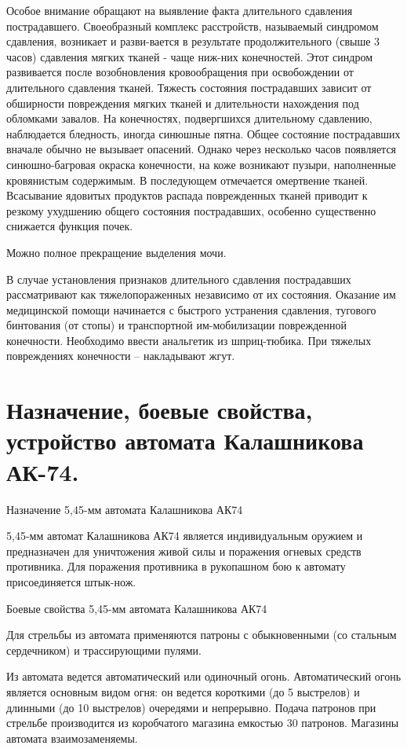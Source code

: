 \documentclass[12pt,a4paper]{report}
\begin{document}
Особое внимание обращают на выявление факта длительного сдавления пострадавшего. Своеобразный комплекс расстройств, называемый синдромом сдавления, возникает и разви-вается в результате продолжительного (свыше 3 часов) сдавления мягких тканей - чаще ниж-них конечностей. Этот синдром развивается после возобновления кровообращения при освобождении от длительного сдавления тканей. Тяжесть состояния пострадавших зависит от обширности повреждения мягких тканей и длительности нахождения под обломками завалов. На конечностях, подвергшихся длительному сдавлению, наблюдается бледность, иногда синюшные пятна. Общее состояние пострадавших вначале обычно не вызывает опасений. Однако через несколько часов появляется синюшно-багровая окраска конечности, на коже возникают пузыри, наполненные кровянистым содержимым. В последующем отмечается омертвение тканей. Всасывание ядовитых продуктов распада поврежденных тканей приводит к резкому ухудшению общего состояния пострадавших, особенно существенно снижается функция почек. 

Можно полное прекращение выделения мочи.

В случае установления признаков длительного сдавления пострадавших рассматривают как тяжелопораженных независимо от их состояния. Оказание им медицинской помощи начинается с быстрого устранения сдавления, тугового бинтования (от стопы) и транспортной им-мобилизации поврежденной конечности. Необходимо ввести анальгетик из шприц-тюбика. При тяжелых повреждениях конечности – накладывают жгут.

\section{Назначение, боевые свойства, устройство автомата Калашникова АК-74.}
Назначение 5,45-мм автомата Калашникова АК74

5,45-мм автомат Калашникова АК74 является индивидуальным оружием и предназначен для уничтожения живой силы и поражения огневых средств противника. Для поражения противника в рукопашном бою к автомату присоединяется штык-нож.

Боевые свойства 5,45-мм автомата Калашникова АК74

Для стрельбы из автомата применяются патроны с обыкновенными (со стальным сердечником) и трассирующими пулями.

Из автомата ведется автоматический или одиночный огонь. Автоматический огонь является основным видом огня: он ведется короткими (до 5 выстрелов) и длинными (до 10 выстрелов) очередями и непрерывно. Подача патронов при стрельбе производится из коробчатого магазина емкостью 30 патронов. Магазины автомата взаимозаменяемы.
\end{document}
